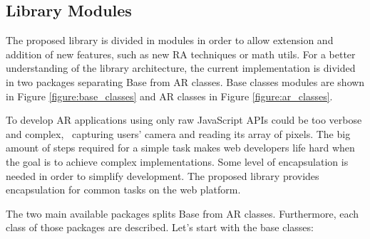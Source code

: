 \subsection{Library Modules} %
\label{sub:ar_library_for_the_web:library_modules}

The proposed library is divided in modules in order to allow extension and addition of new features, such as new RA techniques or math utils. For a better understanding of the library architecture, the current implementation is divided in two packages separating Base from AR classes. Base classes modules are shown in Figure \ref{figure:base_classes} and AR classes in Figure \ref{figure:ar_classes}.

To develop AR applications using only raw JavaScript \cite{International2009} APIs \cite{MDN2013} could be too verbose and complex, \eg\ capturing users' camera and reading its array of pixels. The big amount of steps required for a simple task makes web developers life hard when the goal is to achieve complex implementations. Some level of encapsulation is needed in order to simplify development. The proposed library provides encapsulation for common tasks on the web platform.

The two main available packages splits Base from AR classes. Furthermore, each class of those packages are described. Let's start with the base classes:

